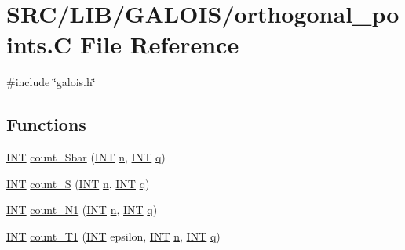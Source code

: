 \hypertarget{_l_i_b_2_g_a_l_o_i_s_2orthogonal__points_8_c}{}\section{S\+R\+C/\+L\+I\+B/\+G\+A\+L\+O\+I\+S/orthogonal\+\_\+points.C File Reference}
\label{_l_i_b_2_g_a_l_o_i_s_2orthogonal__points_8_c}
{\ttfamily \#include \char`\"{}galois.\+h\char`\"{}}\newline
\subsection*{Functions}
\begin{DoxyCompactItemize}
\item 
\mbox{\hyperlink{galois_8h_a09fddde158a3a20bd2dcadb609de11dc}{I\+NT}} \mbox{\hyperlink{_l_i_b_2_g_a_l_o_i_s_2orthogonal__points_8_c_a6b49fc2deeb261dc894f2fbe34a05e79}{count\+\_\+\+Sbar}} (\mbox{\hyperlink{galois_8h_a09fddde158a3a20bd2dcadb609de11dc}{I\+NT}} \mbox{\hyperlink{simeon_8_c_a7f2cd26777ce0ff3fdaf8d02aacbddfb}{n}}, \mbox{\hyperlink{galois_8h_a09fddde158a3a20bd2dcadb609de11dc}{I\+NT}} \mbox{\hyperlink{simeon_8_c_a92cbb483a3b27ae1a0dbfcb125ce216f}{q}})
\item 
\mbox{\hyperlink{galois_8h_a09fddde158a3a20bd2dcadb609de11dc}{I\+NT}} \mbox{\hyperlink{_l_i_b_2_g_a_l_o_i_s_2orthogonal__points_8_c_a9c6bd1c31d71d399cac8afa0713f56b9}{count\+\_\+S}} (\mbox{\hyperlink{galois_8h_a09fddde158a3a20bd2dcadb609de11dc}{I\+NT}} \mbox{\hyperlink{simeon_8_c_a7f2cd26777ce0ff3fdaf8d02aacbddfb}{n}}, \mbox{\hyperlink{galois_8h_a09fddde158a3a20bd2dcadb609de11dc}{I\+NT}} \mbox{\hyperlink{simeon_8_c_a92cbb483a3b27ae1a0dbfcb125ce216f}{q}})
\item 
\mbox{\hyperlink{galois_8h_a09fddde158a3a20bd2dcadb609de11dc}{I\+NT}} \mbox{\hyperlink{_l_i_b_2_g_a_l_o_i_s_2orthogonal__points_8_c_a879b579a4ddaffbc75b230e81e33dcf4}{count\+\_\+\+N1}} (\mbox{\hyperlink{galois_8h_a09fddde158a3a20bd2dcadb609de11dc}{I\+NT}} \mbox{\hyperlink{simeon_8_c_a7f2cd26777ce0ff3fdaf8d02aacbddfb}{n}}, \mbox{\hyperlink{galois_8h_a09fddde158a3a20bd2dcadb609de11dc}{I\+NT}} \mbox{\hyperlink{simeon_8_c_a92cbb483a3b27ae1a0dbfcb125ce216f}{q}})
\item 
\mbox{\hyperlink{galois_8h_a09fddde158a3a20bd2dcadb609de11dc}{I\+NT}} \mbox{\hyperlink{_l_i_b_2_g_a_l_o_i_s_2orthogonal__points_8_c_af42a0ed4f726c58cdeb601b55bddf0ce}{count\+\_\+\+T1}} (\mbox{\hyperlink{galois_8h_a09fddde158a3a20bd2dcadb609de11dc}{I\+NT}} epsilon, \mbox{\hyperlink{galois_8h_a09fddde158a3a20bd2dcadb609de11dc}{I\+NT}} \mbox{\hyperlink{simeon_8_c_a7f2cd26777ce0ff3fdaf8d02aacbddfb}{n}}, \mbox{\hyperlink{galois_8h_a09fddde158a3a20bd2dcadb609de11dc}{I\+NT}} \mbox{\hyperlink{simeon_8_c_a92cbb483a3b27ae1a0dbfcb125ce216f}{q}})

\end{DoxyCompactItemize}

